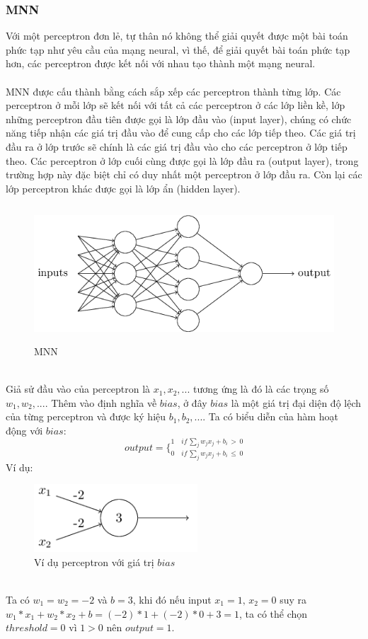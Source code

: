 \subsubsection{MNN}
Với một perceptron đơn lẻ, tự thân nó không thể giải quyết được một bài toán 
phức tạp như yêu cầu của mạng neural, vì thế, để giải quyết bài toán phức tạp 
hơn, các perceptron được kết nối với nhau tạo thành một mạng neural.\\\\
MNN được cấu thành bằng cách sắp xếp các perceptron thành 
từng lớp. Các perceptron ở mỗi lớp sẽ kết nối với tất cả các perceptron ở các 
lớp liền kề, lớp những perceptron đầu tiên được gọi là lớp đầu vào (input layer), 
chúng có chức năng tiếp nhận các giá trị đầu vào để cung cấp cho các lớp tiếp 
theo. Các giá trị đầu ra ở lớp trước sẽ chính là các giá trị đầu vào cho 
các perceptron ở lớp tiếp theo. Các perceptron ở lớp cuối cùng được gọi là lớp 
đầu ra (output layer), trong trường hợp này đặc biệt chỉ có duy nhất một 
perceptron ở lớp đầu ra. Còn lại các lớp perceptron khác được gọi là lớp ẩn 
(hidden layer).\\
\begin{figure}[h!]
\centering
\includegraphics[height=2in, keepaspectratio=true]{multilayerneuralnetwork.png}
\caption{MNN}
\end{figure}\\
Giả sử đầu vào của perceptron là $x_1, x_2, ...$ tương ứng là đó là các trọng 
số $w_1, w_2, ...$. Thêm vào định nghĩa về $bias$, ở đây $bias$ là một giá trị 
đại diện độ lệch của từng perceptron và được ký hiệu $b_1, b_2, ...$. Ta có 
biểu diễn của hàm hoạt động với $bias$:\\
\[
  output = 
  \bigg\{
    _{0 \quad if \, \sum_j w_j x_j + b_i\, \leq \, 0}
    ^{1 \quad if \, \sum_j w_j x_j + b_i\, > \, 0}
\]
Ví dụ:
\begin{figure}[h!]
\centering
\includegraphics[height=1in, keepaspectratio=true]{exmln.png}
\caption{Ví dụ perceptron với giá trị $bias$}
\end{figure}\\
Ta có $w_1=w_2=-2$ và $b=3$, khi đó nếu input $x_1=1,\, x_2=0$ suy ra $ 
w_1*x_1+w_2*x_2+b=(-2)*1+(-2)*0+3=1$, ta có thể chọn $threshold=0$ vì $1>0$
nên $output=1$.
